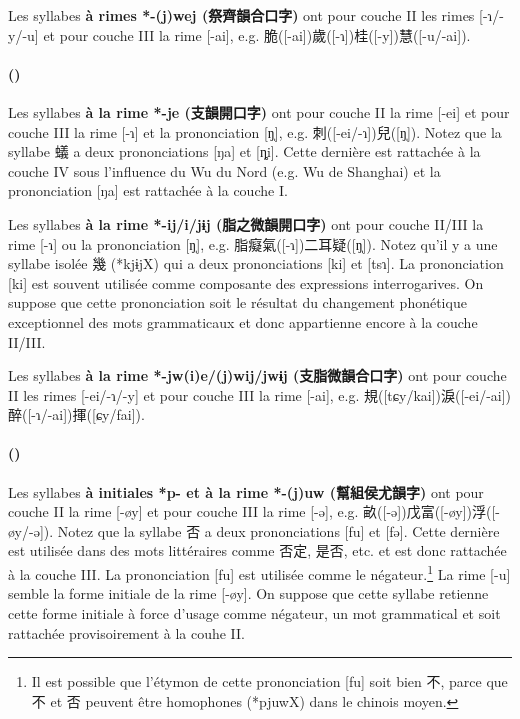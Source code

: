 \documentclass{scrbook}
\newcounter{c}[subsubsection]
\newcommand{\stpc}[1]{\stepcounter{#1}}
\newcommand{\termyyx}[1]{\textbf{#1}}
\begin{document}
\begin{sloppypar}
Les syllabes \termyyx{à rimes *-(j)wej (祭齊韻合口字)} ont pour couche II les rimes [-ɿ/-y/-u] et pour couche III la rime [-ai], e.g. 脆([-ai])歲([-ɿ])桂([-y])慧([-u/-ai]).

\stpc{c}\paragraph{()}
Les syllabes \termyyx{à la rime *-je (支韻開口字)} ont pour couche II la rime [-ei] et pour couche III la rime [-ɿ] et la prononciation [ŋ̩], e.g. 刺([-ei/-ɿ])兒([ŋ̩]). Notez que la syllabe 蟻 a deux prononciations [ŋa] et [ȵi]. Cette dernière est rattachée à la couche IV sous l'influence du Wu du Nord (e.g. Wu de Shanghai) et la prononciation [ŋa] est rattachée à la couche I.

Les syllabes \termyyx{à la rime *-ij/i/jɨj (脂之微韻開口字)} ont pour couche II/III la rime [-ɿ] ou la prononciation [ŋ̩], e.g. 脂癡氣([-ɿ])二耳疑([ŋ̩]). Notez qu'il y a une syllabe isolée 幾 (*kjɨjX) qui a deux prononciations [ki] et [tsɿ]. La prononciation [ki] est souvent utilisée comme composante des expressions interrogarives. On suppose que cette prononciation soit le résultat du changement phonétique exceptionnel des mots grammaticaux et donc appartienne encore à la couche II/III. 

Les syllabes \termyyx{à la rime *-jw(i)e/(j)wij/jwɨj (支脂微韻合口字)} ont pour couche II les rimes [-ei/-ɿ/-y] et pour couche III la rime [-ai], e.g. 規([tɕy/kai])淚([-ei/-ai])醉([-ɿ/-ai])揮([ɕy/fai]).

\stpc{c}\paragraph{()}
Les syllabes \termyyx{à initiales *p- et à la rime *-(j)uw (幫組侯尤韻字)} ont pour couche II la rime [-øy] et pour couche III la rime [-ə], e.g. 畝([-ə])戊富([-øy])浮([-øy/-ə]). Notez que la syllabe 否 a deux prononciations [fu] et [fə]. Cette dernière est utilisée dans des mots littéraires comme 否定, 是否, etc. et est donc rattachée à la couche III. La prononciation [fu] est utilisée comme le négateur.\footnote{Il est possible que l'étymon de cette prononciation [fu] soit bien 不, parce que 不 et 否 peuvent être homophones (*pjuwX) dans le chinois moyen.} La rime [-u] semble la forme initiale de la rime [-øy]. On suppose que cette syllabe retienne cette forme initiale à force d'usage comme négateur, un mot grammatical et soit rattachée provisoirement à la couhe II.


\end{sloppypar}
\end{document}

